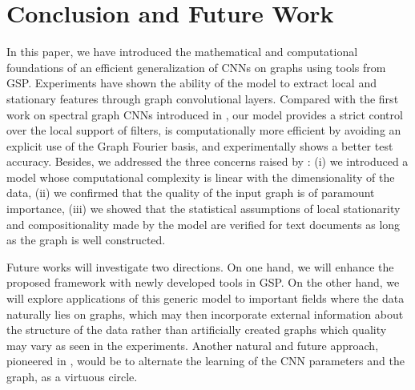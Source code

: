 \documentclass{article}
\begin{document}

\section{Conclusion and Future Work}

In this paper, we have introduced the mathematical and computational
foundations of an efficient generalization of CNNs on graphs using tools from
GSP. Experiments have shown the ability of the model to extract local and
stationary features through graph convolutional layers. Compared with the first
work on spectral graph CNNs introduced in \cite{art:BrunaZarembaSzlamLeCun13DLgraphs}, our model provides a
strict control over the local support of filters, is computationally more
efficient by avoiding an explicit use of the Graph Fourier basis, and
experimentally shows a better test accuracy. Besides, we addressed the three
concerns raised by \cite{art:HenaffBrunaLeCun15DLgraphs}: (i) we introduced a
model whose computational complexity is linear with the dimensionality of the
data, (ii) we confirmed that the quality of the input graph is of paramount
importance, (iii) we showed that the statistical assumptions of local
stationarity and compositionality made by the model are verified for text
documents as long as the graph is well constructed.

Future works will investigate two directions. On one hand, we will enhance the
proposed framework with newly developed tools in GSP. On the other hand, we
will explore applications of this generic model to important fields where the
data naturally lies on graphs, which may then incorporate external information
about the structure of the data rather than artificially created graphs which
quality may vary as seen in the experiments. Another natural and future
approach, pioneered in \cite{art:HenaffBrunaLeCun15DLgraphs}, would be to
alternate the learning of the CNN parameters and the graph, as a virtuous
circle.

\end{document}
